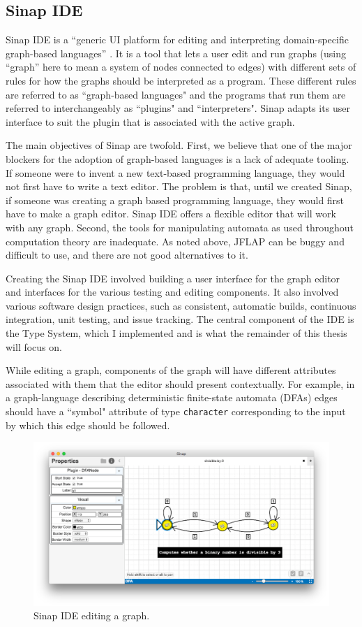 \documentclass[12pt]{article}
\begin{document}
\subsection{Sinap IDE}

Sinap IDE is a ``generic UI platform 
for editing and interpreting domain-specific graph-based languages''
\cite{sinap-ide}. It is a tool that lets a user edit and run graphs
(using ``graph'' here to mean a system of nodes connected to edges) with
different sets of rules for how the graphs should be interpreted as a
program. These different rules are referred to as ``graph-based languages"
and the programs that run them are referred to interchangeably as 
``plugins" and ``interpreters". Sinap adapts its user interface to 
suit the plugin that is associated with the active graph. 

The main objectives of Sinap are twofold. First, we believe that one
of the major blockers for the adoption of graph-based languages is 
a lack of adequate tooling. If someone were to invent a new text-based programming
language, they would not first have to write a text editor. The problem is
that, until we created Sinap, if someone was creating a graph based programming
language, they would first have to make a graph editor. Sinap IDE 
offers a flexible editor that will work with any graph. Second, 
the tools for manipulating automata as used throughout computation 
theory are inadequate. As noted above, JFLAP can be buggy and 
difficult to use, and there are not good alternatives to it. 

Creating the Sinap IDE involved building a user interface for the graph editor and
interfaces for the various testing and editing components. 
It also involved various software design practices, such as
consistent, automatic builds, continuous integration, 
unit testing, and issue tracking. The central component of the IDE is 
the Type System, which I implemented and is what the remainder of this
thesis will focus on.

While editing a graph, components of the
graph will have different attributes associated with them 
that the editor should present contextually. For example, in
a graph-language describing deterministic finite-state 
automata (DFAs) edges should have a ``symbol" attribute of 
type \texttt{character} corresponding to the input by which this 
edge should be followed. 

\begin{figure}
    \centering
    \includegraphics[width=.8\textwidth]{sinap-screenshot}
    \caption{Sinap IDE editing a graph.}
    \label{sinap-screenshot}  
\end{figure}
\end{document}
